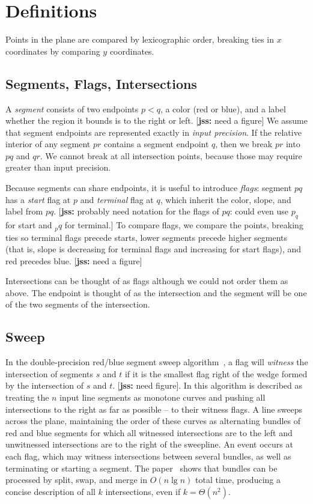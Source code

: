 \documentclass[11pt]{article}
\def\jss#1{{\footnotesize [{\bf jss:} #1]}}
\begin{document}
\section{Definitions}
Points in the plane are compared by lexicographic order, breaking ties in $x$ coordinates by comparing $y$ coordinates.

\subsection{Segments, Flags, Intersections}
A \textit{segment} consists of two endpoints $p<q$, a color (red or blue), and
a label whether the region it bounds is to the right or left. \jss{need a figure}
We assume that segment endpoints are represented exactly in {\it input precision}.
If the relative interior of any segment $pr$ contains a segment endpoint $q$, 
then we break $pr$ into $pq$ and $qr$. We cannot break at all intersection points, 
because those may require greater than input precision. 

Because segments can share endpoints, it is useful to introduce \textit{flags}: 
segment $pq$ has a \textit{start} flag at $p$ and \textit{terminal} flag at $q$, 
which inherit the color, slope, and label from $pq$. 
\jss{probably need notation for the flags of $pq$: could even use $p_q$ for start and $_pq$ for terminal.}
To compare flags, we compare the points, breaking ties so terminal flags precede starts, 
lower segments precede higher segments (that is, slope is decreasing for terminal flags and increasing for start flags), and red precedes blue. \jss{need a figure}

Intersections can be thought of as flags although we could not order them as above.
The endpoint is thought of as the intersection and the segment will be one of the two segments of the intersection.

\subsection{Sweep}\label{sec sweep}
In the double-precision red/blue segment sweep algorithm~\cite{MS}, a flag will \textit{witness} the intersection of segments $s$ and $t$ if it is the smallest flag right of the wedge formed by the intersection of $s$ and $t$. \jss{need figure}. 
In \cite{MS} this algorithm is described as 
treating the $n$ input line segments as monotone curves and pushing all intersections to the right as far as possible -- to their witness flags. 
A line sweeps across the plane, maintaining the order of these curves as alternating bundles of red and blue segments for which all witnessed intersections are to the left and unwitnessed intersections are to the right of the sweepline. 
An event occurs at each flag, which may witness intersections between several bundles, as well as terminating or starting a segment.  
The paper~\cite{MS} shows that bundles can be processed by split, swap, and merge in $O(n\lg n)$ total time, producing a concise description of all $k$ intersections, even if $k=\Theta(n^2)$.
\end{document}
